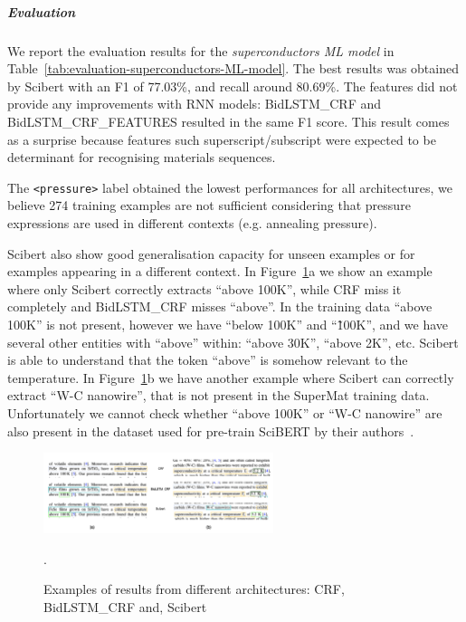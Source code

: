 \documentclass{article}
\begin{document}
\subparagraph{Evaluation}

We report the evaluation results for the \textit{superconductors ML model} in Table~\ref{tab:evaluation-superconductors-ML-model}. 
The best results was obtained by Scibert with an F1 of 77.03\%, and recall around 80.69\%. 
The features did not provide any improvements with RNN models: BidLSTM\_CRF and BidLSTM\_CRF\_FEATURES resulted in the same F1 score.
This result comes as a surprise because features such superscript/subscript were expected to be determinant for recognising materials sequences. 

The \texttt{<pressure>} label obtained the lowest performances for all architectures, we believe 274 training examples are not sufficient considering that pressure expressions are used in different contexts (e.g. annealing pressure).

Scibert also show good generalisation capacity for unseen examples or for examples appearing in a different context. 
In Figure~\ref{fig:example-comparison-architectures}a we show an example where only Scibert correctly extracts ``above 100K'', while CRF miss it completely and BidLSTM\_CRF misses ``above''. 
In the training data ``above 100K'' is not present, however we have ``below 100K'' and ``\~100K'', and we have several other entities with ``above'' within: ``above 30K'', ``above 2K'', etc. 
Scibert is able to understand that the token ``above'' is somehow relevant to the temperature. 
In Figure~\ref{fig:example-comparison-architectures}b we have another example where Scibert can correctly extract ``W-C nanowire'', that is not present in the SuperMat training data. 
Unfortunately we cannot check whether ``above 100K'' or ``W-C nanowire'' are also present in the dataset used for pre-train SciBERT by their authors~\cite{Beltagy2019SciBERT}. 

\begin{figure}[ht]
\centering
\includegraphics[width=0.6\textwidth]{example-comparison-archs.png}
\caption{Examples of results from different architectures: CRF, BidLSTM\_CRF and, Scibert}.
\label{fig:example-comparison-architectures}
\end{figure}
\end{document}
